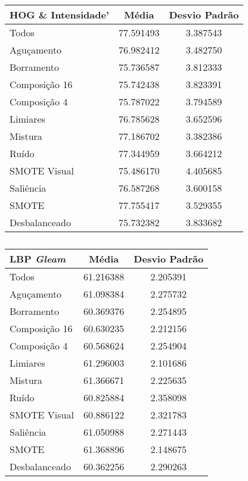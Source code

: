 \begin{table}[!htbp]
\centering
\caption{}
\label{tab:resultados:x:melhor}
\begin{tabular}{|l|c|c|}
\hline
\textbf{HOG \& Intensidade'} & \textbf{Média}     & \textbf{Desvio Padrão} \\ \hline
   Todos        &  77.591493 &  3.387543  \\ \hline
  Aguçamento    &  76.982412 &  3.482750  \\ \hline
  Borramento    &  75.736587 &  3.812333  \\ \hline
  Composição 16 &  75.742438 &  3.823391  \\ \hline
  Composição 4  &  75.787022 &  3.794589  \\ \hline
  Limiares      &  76.785628 &  3.652596  \\ \hline
  Mistura       &  77.186702 &  3.382386  \\ \hline
  Ruído         &  77.344959 &  3.664212  \\ \hline
  SMOTE Visual  &  75.486170 &  4.405685  \\ \hline
  Saliência     &  76.587268 &  3.600158  \\ \hline
 SMOTE          &  77.755417 &  3.529355  \\ \hline
Desbalanceado   &  75.732382 &  3.833682  \\ \hline
\end{tabular}
\end{table}

\begin{table}[!htbp]
\centering
\caption{}
\label{tab:resultados:x:melhor}
\begin{tabular}{|l|c|c|}
\hline
\textbf{LBP \emph{Gleam}} & \textbf{Média}     & \textbf{Desvio Padrão} \\ \hline
   Todos        &  61.216388 &  2.205391  \\ \hline
  Aguçamento    &  61.098384 &  2.275732  \\ \hline
  Borramento    &  60.369376 &  2.254895  \\ \hline
  Composição 16 &  60.630235 &  2.212156  \\ \hline
  Composição 4  &  60.568624 &  2.254904  \\ \hline
  Limiares      &  61.296003 &  2.101686  \\ \hline
  Mistura       &  61.366671 &  2.225635  \\ \hline
  Ruído         &  60.825884 &  2.358098  \\ \hline
  SMOTE Visual  &  60.886122 &  2.321783  \\ \hline
  Saliência     &  61.050988 &  2.271443  \\ \hline
 SMOTE          &  61.368896 &  2.148675  \\ \hline
Desbalanceado   &  60.362256 &  2.290263  \\ \hline
\end{tabular}
\end{table}

